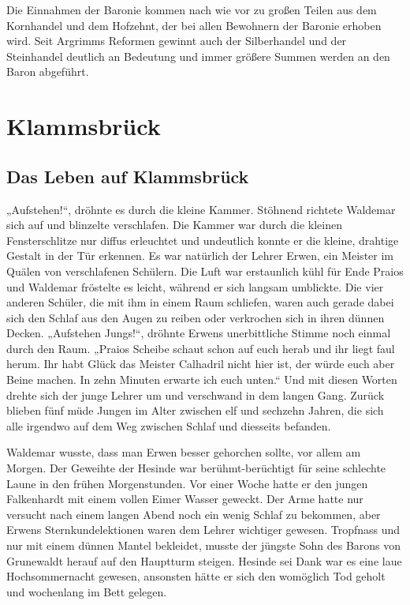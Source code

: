 Die Einnahmen der Baronie kommen nach wie vor zu großen Teilen aus dem Kornhandel und dem Hofzehnt, der bei allen Bewohnern der Baronie erhoben wird. Seit Argrimms Reformen gewinnt auch der Silberhandel und der Steinhandel deutlich an Bedeutung und immer größere Summen werden an den Baron abgeführt.

\section{Klammsbrück}
\subsection{Das Leben auf Klammsbrück}

„Aufstehen!“, dröhnte es durch die kleine Kammer. Stöhnend richtete Waldemar sich auf und blinzelte verschlafen. Die Kammer war durch die kleinen Fensterschlitze nur diffus erleuchtet und undeutlich konnte er die kleine, drahtige Gestalt in der Tür erkennen. Es war natürlich der Lehrer Erwen, ein Meister im Quälen von verschlafenen Schülern. Die Luft war erstaunlich kühl für Ende Praios und Waldemar fröstelte es leicht, während er sich langsam umblickte. Die vier anderen Schüler, die mit ihm in einem Raum schliefen, waren auch gerade dabei sich den Schlaf aus den Augen zu reiben oder verkrochen sich in ihren dünnen Decken. „Aufstehen Jungs!“, dröhnte Erwens unerbittliche Stimme noch einmal durch den Raum. „Praios Scheibe schaut schon auf euch herab und ihr liegt faul herum. Ihr habt Glück das Meister Calhadril nicht hier ist, der würde euch aber Beine machen. In zehn Minuten erwarte ich euch unten.“ Und mit diesen Worten drehte sich der junge Lehrer um und verschwand in dem langen Gang. Zurück blieben fünf müde Jungen im Alter zwischen elf und sechzehn Jahren, die sich alle irgendwo auf dem Weg zwischen Schlaf und diesseits befanden.

Waldemar wusste, dass man Erwen besser gehorchen sollte, vor allem am Morgen. Der Geweihte der Hesinde war berühmt-berüchtigt für seine schlechte Laune in den frühen Morgenstunden. Vor einer Woche hatte er den jungen Falkenhardt mit einem vollen Eimer Wasser geweckt. Der Arme hatte nur versucht nach einem langen Abend noch ein wenig Schlaf zu bekommen, aber Erwens Sternkundelektionen waren dem Lehrer wichtiger gewesen. Tropfnass und nur mit einem dünnen Mantel bekleidet, musste der jüngste Sohn des Barons von Grunewaldt herauf auf den Hauptturm steigen. Hesinde sei Dank war es eine laue Hochsommernacht gewesen, ansonsten hätte er sich den womöglich Tod geholt und wochenlang im Bett gelegen.

